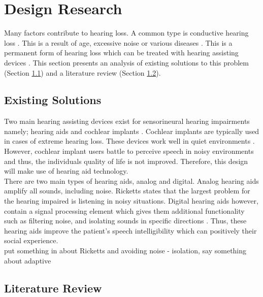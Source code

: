 \documentclass[12pt, onecolumn]{article}
\begin{document}
\section{Design Research}

\noindent Many factors contribute to hearing loss. A common type is conductive hearing loss \cite{earinfo}. This is a result of age, excessive noise or various diseases \cite{hearIt}. This is a permanent form of hearing loss which can be treated with hearing assisting devices \cite{hearIt}. This section presents an analysis of existing solutions to this problem (Section \ref{sec:existSoln}) and a literature review (Section \ref{sec:litReview}).

\subsection{Existing Solutions}
\label{sec:existSoln}

\noindent Two main hearing assisting devices exist for sensorineural hearing impairments namely; hearing aids and cochlear implants \cite{atlantic}. Cochlear implants are typically used in cases of extreme hearing loss. These devices work well in quiet environments \cite{carroll}. However, cochlear implant users battle to perceive speech in noisy environments \cite{carroll} and thus, the individuals quality of life is not improved. Therefore, this design will make use of hearing aid technology.\\
\newline
\noindent There are two main types of hearing aids, analog and digital. Analog hearing aids amplify all sounds, including noise\cite{woodford}. Ricketts \cite{ricketts} states that the largest problem for the hearing impaired is listening in noisy situations. Digital hearing aids however, contain a signal processing element which gives them additional functionality such as filtering noise, and isolating sounds in specific directions \cite{ricketts}. Thus, these hearing aids improve the patient's speech intelligibility which can positively their social experience.\\

put something in about Ricketts and avoiding noise - isolation, say something about adaptive

\subsection{Literature Review}
\label{sec:litReview}
\end{document}
